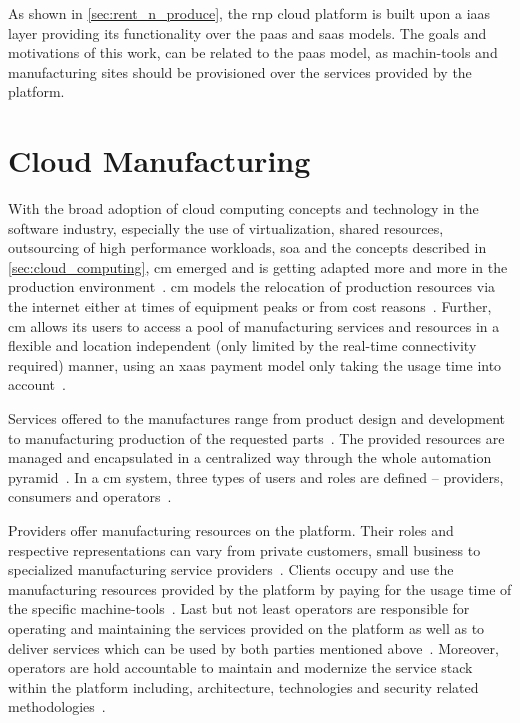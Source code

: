 \documentclass[
a4paper,
twoside,
headsepline,
cleardoublepage=empty,
parskip=half,
draft=false
]{scrbook}
\begin{document}
			As shown in \cref{sec:rent_n_produce}, the \gls{rnp} cloud platform is built upon a \gls{iaas} layer providing its functionality over the \gls{paas} and \gls{saas} models. The goals and motivations of this work, can be related to the \gls{paas} model, as machin-tools and manufacturing sites should be provisioned over the services provided by the platform.

		\section{Cloud Manufacturing}\label{sec:cloud_manufacturing}

			With the broad adoption of cloud computing concepts and technology in the software industry, especially the use of virtualization, shared resources, outsourcing of high performance workloads, \gls{soa} and the concepts described in \cref{sec:cloud_computing}, \gls{cm} emerged and is getting adapted more and more in the production environment~\cite{he2015state}. \gls{cm} models the relocation of production resources via the internet either at times of equipment peaks or from cost reasons~\cite{wu2013cloud}. Further, \gls{cm} allows its users to access a pool of manufacturing services and resources in a flexible and location independent (only limited by the real-time connectivity required) manner, using an \gls{xaas} payment model only taking the usage time into account~\cite{macia2012cloud}.

			Services offered to the manufactures range from product design and development to manufacturing production of the requested parts~\cite{xu2012cloud}. The provided resources  are managed and encapsulated in a centralized way through the whole automation pyramid~\cite{kleinemeier2014automatisierungspyramide}.
			In a \gls{cm} system, three types of users and roles are defined -- providers, consumers and operators~\cite{wu2013cloud}.

			Providers offer manufacturing resources on the platform.
			Their roles and respective representations can vary from private customers, small business to specialized manufacturing service providers~\cite{tao2014cciot}.
			Clients occupy and use the manufacturing resources provided by the platform by paying for the usage time of the specific machine-tools~\cite{he2015state}.
			Last but not least operators are responsible for operating and maintaining the services provided on the platform as well as to deliver services which can be used by both parties mentioned above~\cite{xu2012cloud}.
			Moreover, operators are hold accountable to maintain and modernize the service stack within the platform including, architecture, technologies and security related methodologies~\cite{tedeschi2015security}.
			
\end{document}
